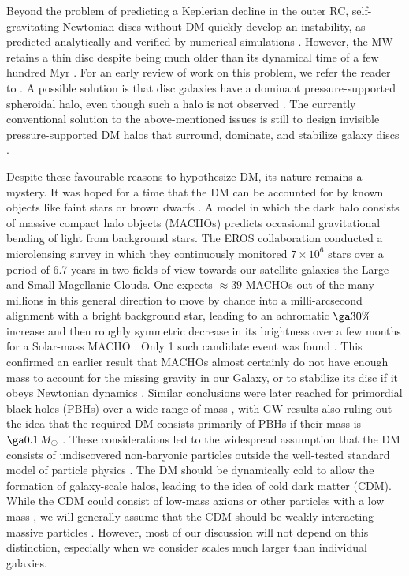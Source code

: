 \documentclass[fleqn,usenatbib,useAMS]{mnras} %
\begin{document}
Beyond the problem of predicting a Keplerian decline in the outer RC, self-gravitating Newtonian discs without DM quickly develop an instability, as predicted analytically \citep{Toomre_1964} and verified by numerical simulations \citep{Hohl_1971}. However, the MW retains a thin disc despite being much older than its dynamical time of a few hundred Myr \citep*{Knox_1999}. For an early review of work on this problem, we refer the reader to \citet{Sellwood_1993}. A possible solution is that disc galaxies have a dominant pressure-supported spheroidal halo, even though such a halo is not observed \citep{Ostriker_Peebles_1973}. The currently conventional solution to the above-mentioned issues is still to design invisible pressure-supported DM halos that surround, dominate, and stabilize galaxy discs \citep*{Ostriker_Peebles_Yahil_1974, White_Rees_78}.

Despite these favourable reasons to hypothesize DM, its nature remains a mystery. It was hoped for a time that the DM can be accounted for by known objects like faint stars or brown dwarfs \citep{Carr_1994}. A model in which the dark halo consists of massive compact halo objects (MACHOs) predicts occasional gravitational bending of light from background stars. The EROS collaboration \citep{Aubourg_1993} conducted a microlensing survey in which they continuously monitored $7 \times 10^6$ stars over a period of 6.7 years in two fields of view towards our satellite galaxies the Large and Small Magellanic Clouds. One expects $\approx 39$ MACHOs out of the many millions in this general direction to move by chance into a milli-arcsecond alignment with a bright background star, leading to an achromatic $\ga 30\%$ increase and then roughly symmetric decrease in its brightness over a few months for a Solar-mass MACHO \citep[the two images are by definition unresolved in microlensing;][]{Refsdal_1966, Paczynski_1986}. Only 1 such candidate event was found \citep{EROS_2007}. This confirmed an earlier result \citep{MACHO_2000} that MACHOs almost certainly do not have enough mass to account for the missing gravity in our Galaxy, or to stabilize its disc if it obeys Newtonian dynamics \citep[for a historical review of microlensing, we refer the reader to][]{Pietrzynski_2018}. Similar conclusions were later reached for primordial black holes (PBHs) over a wide range of mass \citep{Niikura_2019}, with GW results also ruling out the idea that the required DM consists primarily of PBHs if their mass is $\ga 0.1 \, M_\odot$ \citep{Wang_2018}. These considerations led to the widespread assumption that the DM consists of undiscovered non-baryonic particles outside the well-tested standard model of particle physics \citep[for a historical review of how this paradigm came about, see][]{Peebles_2017_DM_review}. The DM should be dynamically cold to allow the formation of galaxy-scale halos, leading to the idea of cold dark matter (CDM). While the CDM could consist of low-mass axions \citep{Sikivie_1983} or other particles with a low mass \citep{Hui_2017}, we will generally assume that the CDM should be weakly interacting massive particles \citep[WIMPs;][]{Kamionkowski_1998}. However, most of our discussion will not depend on this distinction, especially when we consider scales much larger than individual galaxies.
\end{document}
